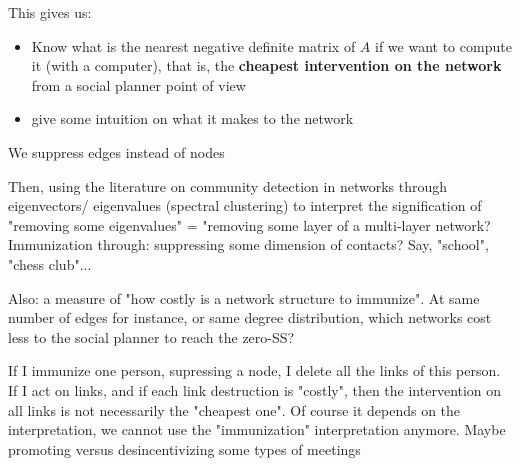 \documentclass[12pt]{article}
\begin{document}
This gives us:
\begin{itemize}[noitemsep,topsep=0pt]
  \item Know what is the nearest negative definite matrix of $A$ if we want to compute it (with a computer), that is, the \textbf{cheapest intervention on the network} from a social planner point of view
\item give some intuition on what it makes to the network
 \end{itemize}

\bigskip

{ \footnotesize { \color{BlueViolet} We suppress edges instead of nodes

\par }}

{ \scriptsize { \color{BlueViolet} Then, using the literature on community detection in networks through eigenvectors/ eigenvalues (spectral clustering) to interpret the signification of "removing some eigenvalues" = "removing some layer of a multi-layer network? Immunization through: suppressing some dimension of contacts? Say, "school", "chess club"...

Also: a measure of "how costly is a network structure to immunize". At same number of edges for instance, or same degree distribution, which networks cost less to the social planner to reach the zero-SS? 
\par}}

{ \scriptsize { \color{JungleGreen} If I immunize one person, supressing a node, I delete all the links of this person. If I act on links, and if each link destruction is "costly", then the intervention on all links is not necessarily the "cheapest one". Of course it depends on the interpretation, we cannot use the "immunization" interpretation anymore. Maybe promoting versus desincentivizing some types of meetings
\par}}




\begin{figure}[htpb]
\end{figure}
\begin{figure}[htpb]
\end{figure}
\end{document}
